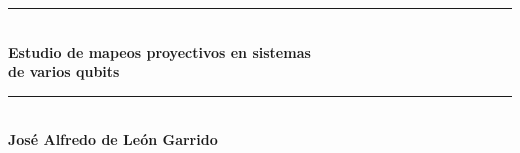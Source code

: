 \documentclass[11pt, spanish, letterpage]{article} %
\date{}
\begin{document}
\begin{titlepage} %
\newcommand{\HRule}{\rule{\linewidth}{0.5mm}} %

\center %

	
\HRule\\[0.6cm]

{\huge\bfseries Estudio de mapeos proyectivos en sistemas\\
de varios qubits}\\[0.5cm] %

\HRule\\[2cm]



\Large{\textbf{José Alfredo de León Garrido}}\\ [2cm] %



\end{titlepage}
\end{document}
